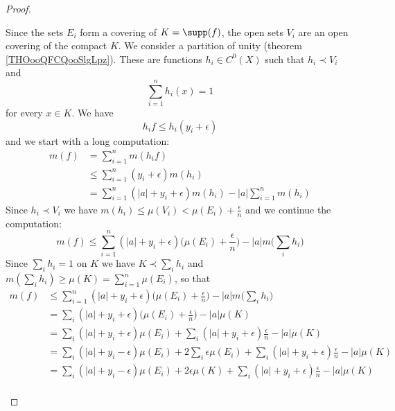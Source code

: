 \begin{proof}
\begin{subproof}
		Since the sets \( E_i\) form a covering of \( K=\supp(f)\), the open sets \( V_i\) are an open covering of the compact \( K\). We consider a partition of unity (theorem \ref{THOooQFCQooSlgLpz}). These are functions \( h_i\in C^0(X)\) such that \( h_i\prec V_i\) and
		\begin{equation}
			\sum_{i=1}^nh_i(x)=1
		\end{equation}
		for every \( x\in K\). We have
		\begin{equation}
			h_if\leq h_i(y_i+\epsilon)
		\end{equation}
		and we start with a long computation:
		\begin{subequations}
			\begin{align}
				m(f) & =\sum_{i=1}^nm(h_if)                                            \\
				     & \leq \sum_{i=1}^n(y_i+\epsilon)m(h_i)                           \\
				     & =\sum_{i=1}^n(| a |+y_i+\epsilon)m(h_i)-| a |\sum_{i=1}^nm(h_i)
			\end{align}
		\end{subequations}
		Since \( h_i\prec V_i\) we have \( m(h_i)\leq \mu(V_i)<\mu(E_i)+\frac{ \epsilon }{ n }\) and we continue the computation:
		\begin{equation}
			m(f)\leq \sum_{i=1}^n(| a |+y_i+\epsilon)\big( \mu(E_i)+\frac{ \epsilon }{ n } \big)-| a |m\big( \sum_i h_i \big)
		\end{equation}
		Since \( \sum_ih_i=1\) on \( K\) we have \( K\prec\sum_ih_i\) and \( m(\sum_ih_i)\geq \mu(K)=\sum_{i=1}^n\mu(E_i)\), so that
		\begin{subequations}
			\begin{align}
				m(f) & \leq \sum_{i=1}^n(| a |+y_i+\epsilon)\big( \mu(E_i)+\frac{ \epsilon }{ n } \big)-| a |m\big( \sum_i h_i \big)                  \\
				     & = \sum_i(| a |+y_i+\epsilon)\big( \mu(E_i)+\frac{ \epsilon }{ n } \big)-| a |\mu(K)                                            \\
				     & =\sum_i(| a |+y_i+\epsilon)\mu(E_i)+\sum_i(| a |+y_i+\epsilon)\frac{ \epsilon }{ n }-| a |\mu(K)                               \\
				     & =\sum_i(| a |+y_i-\epsilon)\mu(E_i)+2\sum_i\epsilon\mu(E_i)+\sum_i(| a |+y_i+\epsilon)\frac{ \epsilon }{ n }-| a |\mu(K)       \\
				     & =\sum_i(| a |+y_i-\epsilon)\mu(E_i)+2\epsilon\mu(K)+\sum_i(| a |+y_i+\epsilon)\frac{ \epsilon }{ n }-| a |\mu(K)               \\

\end{align}
\end{subequations}
\end{subproof}
\end{proof}
